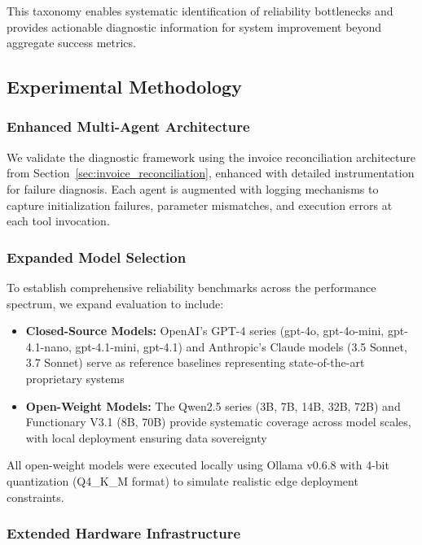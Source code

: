 This taxonomy enables systematic identification of reliability bottlenecks and provides actionable diagnostic information for system improvement beyond aggregate success metrics.

\subsection{Experimental Methodology}

\subsubsection{Enhanced Multi-Agent Architecture}

We validate the diagnostic framework using the invoice reconciliation architecture from Section~\ref{sec:invoice_reconciliation}, enhanced with detailed instrumentation for failure diagnosis. Each agent is augmented with logging mechanisms to capture initialization failures, parameter mismatches, and execution errors at each tool invocation.

\subsubsection{Expanded Model Selection}

To establish comprehensive reliability benchmarks across the performance spectrum, we expand evaluation to include:

\begin{itemize}[leftmargin=*]
    \item \textbf{Closed-Source Models:} OpenAI's GPT-4 series (gpt-4o, gpt-4o-mini, gpt-4.1-nano, gpt-4.1-mini, gpt-4.1) and Anthropic's Claude models (3.5 Sonnet, 3.7 Sonnet) serve as reference baselines representing state-of-the-art proprietary systems
    \item \textbf{Open-Weight Models:} The Qwen2.5 series (3B, 7B, 14B, 32B, 72B) and Functionary V3.1 (8B, 70B) provide systematic coverage across model scales, with local deployment ensuring data sovereignty
\end{itemize}

All open-weight models were executed locally using Ollama v0.6.8 with 4-bit quantization (Q4\_K\_M format) to simulate realistic edge deployment constraints.

\subsubsection{Extended Hardware Infrastructure}

